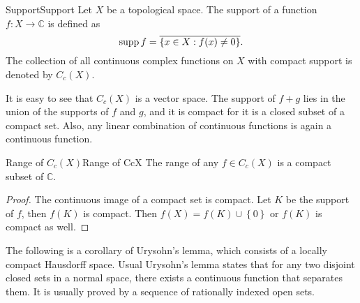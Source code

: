 \documentclass[../main.tex]{subfiles}
\begin{document}
\begin{definition}{Support}{Support}
Let $X$ be a topological space. The support of a function $f: X \rightarrow \mathbb{C}$ is defined as
\begin{equation*}
	\operatorname{supp} f = \overline{\left\{ x \in X: f(x) \neq 0 \right\}}.
\end{equation*}
The collection of all continuous complex functions on $X$ with compact support is denoted by $C_c(X)$.
\end{definition}

It is easy to see that $C_c(X)$ is a vector space. The support of $f+g$ lies in the union of the supports of $f$ and $g$, and it is compact for it is a closed subset of a compact set. Also, any linear combination of continuous functions is again a continuous function.

\begin{proposition}{Range of $C_c(X)$}{Range of CcX}
The range of any $f\in C_c(X)$ is a compact subset of $\mathbb{C}$.
\end{proposition}
\begin{proof}
	The continuous image of a compact set is compact. Let $K$ be the support of $f$, then $f(K)$ is compact. Then $f(X) = f(K) \cup \left\{ 0 \right\}$ or $f(K)$ is compact as well.
\end{proof}

The following is a corollary of Urysohn's lemma, which consists of a locally compact Hausdorff space. Usual Urysohn's lemma states that for any two disjoint closed sets in a normal space, there exists a continuous function that separates them. It is usually proved by a sequence of rationally indexed open sets.
\end{document}
